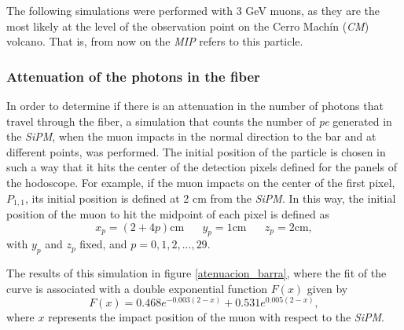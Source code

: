 \documentclass[submitting]{nst}
\begin{document}
The following simulations were performed with 3 GeV muons, as they are the most likely at the level of the observation point on the Cerro Machín (\textsl{CM}) volcano. That is, from now on the \textsl{MIP} refers to this particle.

\subsubsection{Attenuation of the photons in the fiber}%
In order to determine if there is an attenuation in the number of photons that travel through the fiber, a simulation that counts the number of \textsl{pe} generated in the \textsl{SiPM}, when the muon impacts in the normal direction to the bar and at different points, was performed. The initial position of the particle is chosen in such a way that it hits the center of the detection pixels defined for the panels of the hodoscope. For example, if the muon impacts on the center of the first pixel, $P_{1,1}$, its initial position is defined at 2 cm from the \textsl{SiPM}. In this way, the initial position of the muon to hit the midpoint of each pixel is defined as
\begin{equation}
\label{positions}
x_p = (2 + 4p)\mathrm{cm} \,\,\,\,\,\,\,\,\,\, y_p = 1\mathrm{cm}  \,\,\,\,\,\,\,\,\,\, z_p = 2\mathrm{cm},
\end{equation}
with $ y_p $ and $ z_p $ fixed, and $ p = 0,1,2, ..., 29$.

The results of this simulation in figure \ref{atenuacion_barra}, where the fit of the curve is associated with a double exponential function $F(x)$ given by 
\begin{equation}
F(x)= \text{0.468} e^{-0.003(2-x)} + \text{0.531}e^{0.005(2-x)},
\end{equation}
where $x$ represents the impact position of the muon with respect to the \textsl{SiPM}. 
\end{document}
